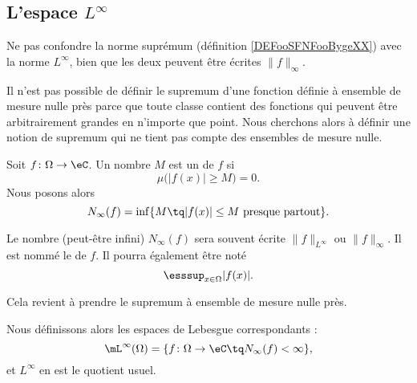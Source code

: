 
\subsection{L'espace \texorpdfstring{\(  L^{\infty}\)}{Linfinity}}
\label{SUBSECooYFJTooBqrLXv}


Ne pas confondre la norme suprémum (définition \ref{DEFooSFNFooBygeXX}) avec la norme \( L^{\infty}\), bien que les deux peuvent être écrites \( \| f \|_{\infty}\).

\begin{normaltext}
	Il n'est pas possible de définir le supremum d'une fonction définie à ensemble de mesure nulle près parce que toute classe contient des fonctions qui peuvent être arbitrairement grandes en n'importe que point. Nous cherchons alors à définir une notion de supremum qui ne tient pas compte des ensembles de mesure nulle.
\end{normaltext}

\begin{definition}      \label{DEFooIQOOooLpJBqi}
	Soit \( f\colon \Omega\to \eC\). Un nombre \( M\) est un  de \( f\) si
	\begin{equation}
		\mu\big( | f(x) |\geq M \big)=0.
	\end{equation}
	Nous posons alors
	\begin{equation}
		N_{\infty}(f)=\inf\{ M\tq | f(x) |\leq M\text{ presque partout} \}.
	\end{equation}

	Le nombre (peut-être infini) \( N_{\infty}(f)\) sera souvent écrite \( \| f \|_{L^{\infty}}\) ou \( \| f \|_{\infty}\). Il est nommé le  de \( f\). Il pourra également être noté
	\begin{equation}		\label{EQooZHKBooPgdzCp}
		\esssup_{x\in \Omega}| f(x) |.
	\end{equation}
\end{definition}
Cela revient à prendre le supremum à ensemble de mesure nulle près.

\begin{definition}      \label{DEFooXUKHooXYrlYq}
	Nous définissons alors les espaces de Lebesgue correspondants :
	\begin{equation}
		\mL^{\infty}(\Omega)=\{ f\colon \Omega\to \eC\tq N_{\infty}(f)<\infty \},
	\end{equation}
	et \( L^{\infty}\) en est le quotient usuel.
\end{definition}

